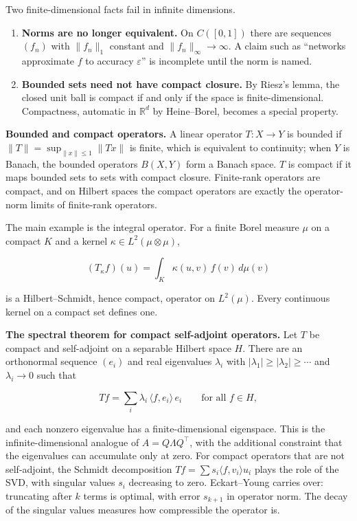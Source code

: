 Two finite-dimensional facts fail in infinite dimensions.

\begin{enumerate}
\def\labelenumi{\arabic{enumi}.}
\tightlist
\item
  \textbf{Norms are no longer equivalent.} On \(C([0,1])\) there are
  sequences \((f_n)\) with \(\|f_n\|_{1}\) constant and \(\|f_n\|_\infty \to \infty\). A claim
  such as ``networks approximate \(f\) to accuracy \(\varepsilon\)'' is incomplete until
  the norm is named.
\item
  \textbf{Bounded sets need not have compact closure.} By Riesz's lemma,
  the closed unit ball is compact if and only if the space is
  finite-dimensional. Compactness, automatic in \(\mathbb{R}^{d}\) by
  Heine--Borel, becomes a special property.
\end{enumerate}

\textbf{Bounded and compact operators.} A linear operator \(T\colon X \to Y\) is
bounded if \(\|T\| = \sup_{\|x\| \le 1} \|Tx\|\) is finite, which is equivalent
to continuity; when \(Y\) is Banach, the bounded operators \(B(X, Y)\) form a
Banach space. \(T\) is compact if it maps bounded sets to sets with compact
closure. Finite-rank operators are compact, and on Hilbert spaces the
compact operators are exactly the operator-norm limits of finite-rank
operators.

The main example is the integral operator. For a finite Borel measure \(\mu\)
on a compact \(K\) and a kernel \(\kappa \in L^{2}(\mu \otimes \mu)\),

\[
(T_\kappa f)(u) = \int_K \kappa(u, v)\, f(v)\, d\mu(v)
\]

is a Hilbert--Schmidt, hence compact, operator on \(L^{2}(\mu)\). Every
continuous kernel on a compact set defines one.

\textbf{The spectral theorem for compact self-adjoint operators.} Let \(T\)
be compact and self-adjoint on a separable Hilbert space \(H\). There are an
orthonormal sequence \((e_i)\) and real eigenvalues \(\lambda_i\) with
\(|\lambda_{1}| \ge |\lambda_{2}| \ge \cdots\) and \(\lambda_i
\to 0\) such that

\[
Tf = \sum_i \lambda_i\, \langle f, e_i \rangle\, e_i \qquad \text{for all } f \in H,
\]

and each nonzero eigenvalue has a finite-dimensional eigenspace. This is
the infinite-dimensional analogue of \(A = Q\Lambda Q^{\top}\), with the
additional constraint that the eigenvalues can accumulate only at zero.
For compact operators that are not self-adjoint, the Schmidt
decomposition \(Tf = \sum s_i \langle f, v_i\rangle u_i\) plays the role of the SVD, with
singular values \(s_i\) decreasing to zero. Eckart--Young carries over:
truncating after \(k\) terms is optimal, with error \(s_{k+1}\) in operator
norm. The decay of the singular values measures how compressible the
operator is.

